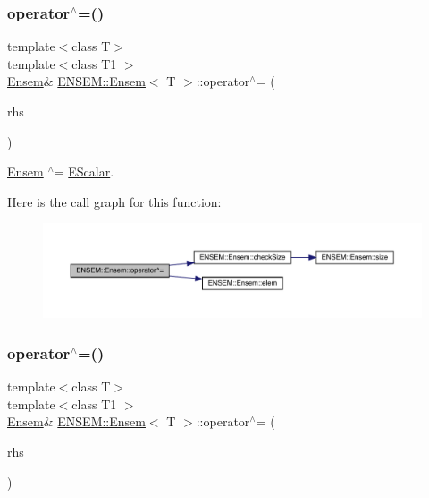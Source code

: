\subsubsection{\texorpdfstring{operator$^\wedge$=()}{operator^=()}\hspace{0.1cm}{\footnotesize\ttfamily [1/3]}}
{\footnotesize\ttfamily template$<$class T$>$ \\
template$<$class T1 $>$ \\
\mbox{\hyperlink{classENSEM_1_1Ensem}{Ensem}}\& \mbox{\hyperlink{classENSEM_1_1Ensem}{E\+N\+S\+E\+M\+::\+Ensem}}$<$ T $>$\+::operator$^\wedge$= (\begin{DoxyParamCaption}\item[{const \mbox{\hyperlink{classENSEM_1_1EScalar}{E\+Scalar}}$<$ T1 $>$ \&}]{rhs }\end{DoxyParamCaption})\hspace{0.3cm}{\ttfamily [inline]}}



\mbox{\hyperlink{classENSEM_1_1Ensem}{Ensem}} $^\wedge$= \mbox{\hyperlink{classENSEM_1_1EScalar}{E\+Scalar}}. 

Here is the call graph for this function\+:
\nopagebreak
\begin{figure}[H]
\begin{center}
\leavevmode
\includegraphics[width=350pt]{d7/d3e/classENSEM_1_1Ensem_a7f9a469a80ccb509892aef8d356fd81e_cgraph}
\end{center}
\end{figure}
\mbox{\label{classENSEM_1_1Ensem_a7f9a469a80ccb509892aef8d356fd81e}} 
\subsubsection{\texorpdfstring{operator$^\wedge$=()}{operator^=()}\hspace{0.1cm}{\footnotesize\ttfamily [2/3]}}
{\footnotesize\ttfamily template$<$class T$>$ \\
template$<$class T1 $>$ \\
\mbox{\hyperlink{classENSEM_1_1Ensem}{Ensem}}\& \mbox{\hyperlink{classENSEM_1_1Ensem}{E\+N\+S\+E\+M\+::\+Ensem}}$<$ T $>$\+::operator$^\wedge$= (\begin{DoxyParamCaption}\item[{const \mbox{\hyperlink{classENSEM_1_1EScalar}{E\+Scalar}}$<$ T1 $>$ \&}]{rhs }\end{DoxyParamCaption})\hspace{0.3cm}{\ttfamily [inline]}}



